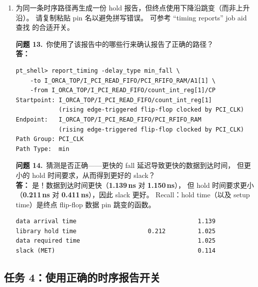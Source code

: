 \begin{enumerate}
  下一步将继续探索并确认你对上述问题的回答。

\begin{questionBox}
\textbf{问题 12.}\ 要确认上述问题的答案，你还需要哪些额外信息？\\[0.35em]
\textbf{答：} 再生成一份以终点下降沿跳变计算数据到达时间的时序报告，并比较两份报告。
由此可确认：终点 flip-flop 数据 pin 的下降跳变确实使 library hold time 更小，从而 slack 更好。
（下一步实验将探索这一点。）
\end{questionBox}

  \item 为同一条时序路径再生成一份 hold 报告，但终点使用下降沿跳变（而非上升沿）。
        请复制粘贴 pin 名以避免拼写错误。
        可参考 ``timing reports'' job aid 查找  的合适开关。

\begin{questionBox}
\textbf{问题 13.}\ 你使用了该报告中的哪些行来确认报告了正确的路径？\\[0.35em]
\textbf{答：}\\
\begin{lstlisting}
pt_shell> report_timing -delay_type min_fall \
    -to I_ORCA_TOP/I_PCI_READ_FIFO/PCI_RFIFO_RAM/A1[1] \
    -from I_ORCA_TOP/I_PCI_READ_FIFO/count_int_reg[1]/CP
Startpoint: I_ORCA_TOP/I_PCI_READ_FIFO/count_int_reg[1]
            (rising edge-triggered flip-flop clocked by PCI_CLK)
Endpoint:   I_ORCA_TOP/I_PCI_READ_FIFO/PCI_RFIFO_RAM
            (rising edge-triggered flip-flop clocked by PCI_CLK)
Path Group: PCI_CLK
Path Type:  min
\end{lstlisting}

\textbf{问题 14.}\ 猜测是否正确——更快的 fall 延迟导致更快的数据到达时间，
        但更小的 hold 时间要求，从而得到更好的 slack？\\[0.35em]
\textbf{答：} 是！数据到达时间更快（\textbf{1.139\,ns} 对 \textbf{1.150\,ns}），
但 hold 时间要求更小（\textbf{0.211\,ns} 对 \textbf{0.411\,ns}），因此 slack 更好。
Recall：hold time（以及 setup time）是终点 flip-flop 数据 pin 跳变的函数。
\begin{lstlisting}
data arrival time                                  1.139
library hold time                    0.212         1.025
data required time                                 1.025
slack (MET)                                        0.114
\end{lstlisting}
\end{questionBox}
\end{enumerate}

\subsection{任务 4：使用正确的时序报告开关}
\label{lab3:task4}

